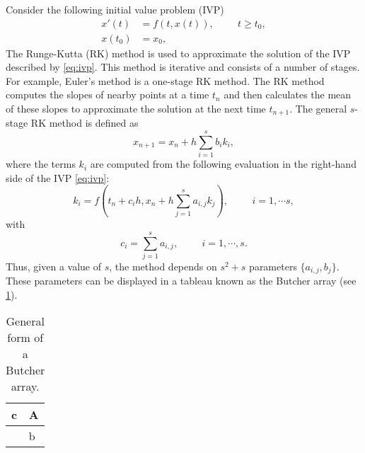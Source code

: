     \noindent Consider the following initial value problem (IVP)
    \begin{equation}\label{eq:ivp}
        \begin{aligned}
            x'(t)  &= f(t, x(t)), \hspace{1cm} t \geq t_0, \\
            x(t_0) &= x_0,
        \end{aligned}
    \end{equation}
    The Runge-Kutta (RK) method is used to approximate the solution of the IVP 
    described by \cref{eq:ivp}. This method is iterative and consists of a number
    of stages. For example, Euler's method is a one-stage RK method. The RK 
    method computes the slopes of nearby points at a time $t_n$ and then 
    calculates the mean of these slopes to approximate the solution at the next
    time $t_{n+1}$. The general $s$-stage RK method is defined as
    \begin{equation}\label{eq:GenSSRK}
        x_{n+1} = x_n + h \sum_{i=1}^{s} b_i k_i,
    \end{equation}
    where the terms $k_i$ are computed from the following evaluation in the 
    right-hand side of the IVP  \eqref{eq:ivp}:
    \begin{equation}\label{eq:kterms}
        k_i = f \left( t_n + c_i h, x_n + h \sum_{j=1}^{s} a_{i,j}k_j\right), %
                \hspace{1cm} i = 1, \cdots s,
    \end{equation}
    with
    \begin{equation}
        c_i =  \sum_{j=1}^{s} a_{i,j}, \hspace{1cm} i = 1, \cdots, s.
    \end{equation}
    Thus, given a value of $s$, the method depends on $s^2 +s$ parameters
    $\{a_{i,j},b_{j}\}$. These parameters can be displayed in a tableau known as the
    Butcher array (see \cref{tab:GButcherArray}).
    \begin{table}[h!]\label{tab:GButcherArray}
        \begin{center}
            \begin{tabular}{l | l } 
                c  & A  \\
                \hline
                \hspace{0.1cm} & b
            \end{tabular}
            \caption{General form of a Butcher array.}
        \end{center}
    \end{table}
